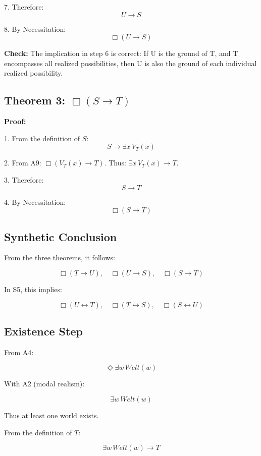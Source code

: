 \documentclass[
]{article}
\begin{document}
7. Therefore:  
   \[
   U \rightarrow S
   \]

8. By Necessitation:  
   \[
   \boxed{\Box(U \rightarrow S)}
   \]

\textbf{Check:} The implication in step 6 is correct: If U is the ground of T, and T encompasses all realized possibilities, then U is also the ground of each individual realized possibility.

\subsection{Theorem 3: \(\Box(S \rightarrow T)\)}\label{theorem-3-boxs-rightarrow-t}

\textbf{Proof:}

1. From the definition of \(S\):  
   \[
   S \rightarrow \exists x\, V_T(x)
   \]

2. From A9: \(\Box(V_T(x) \rightarrow T)\).  
   Thus: \(\exists x\, V_T(x) \rightarrow T\).

3. Therefore:  
   \[
   S \rightarrow T
   \]

4. By Necessitation:  
   \[
   \boxed{\Box(S \rightarrow T)}
   \]

\subsection{Synthetic Conclusion}\label{synthetic-conclusion}

From the three theorems, it follows:

\[
\Box(T \rightarrow U), \quad \Box(U \rightarrow S), \quad \Box(S \rightarrow T)
\]

In S5, this implies:

\[
\Box(U \leftrightarrow T), \quad \Box(T \leftrightarrow S), \quad \Box(S \leftrightarrow U)
\]

\subsection{Existence Step}\label{existence-step}

From A4:

\[
\Diamond\exists w\, Welt(w)
\]

With A2 (modal realism):

\[
\exists w\, Welt(w)
\]

Thus at least one world exists.

From the definition of \(T\):

\[
\exists w\, Welt(w) \rightarrow T
\]
\end{document}
